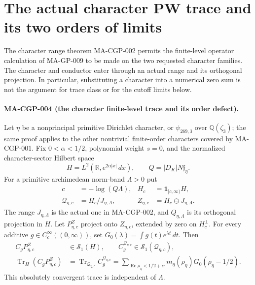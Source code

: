 \section{The actual character PW trace and its two orders of limits}
\label{sec:character-pw-trace}

The character range theorem MA-CGP-002 permits the finite-level
operator calculation of MA-GP-009 to be made on the two requested
character families.  The character and conductor enter through
an actual range and its orthogonal projection.  In particular,
substituting a character into a numerical zero sum is not the
argument for trace class or for the cutoff limits below.

\paragraph{MA-CGP-004 (the character finite-level trace and its order defect).}
Let $\eta$ be a nonprincipal primitive Dirichlet character, or
$\psi_{269,3}$ over $\mathbb Q(\zeta_3)$; the same proof applies
to the other nontrivial finite-order characters covered by
MA-CGP-001.  Fix $0<\alpha<1/2$, polynomial weight $s=0$,
and the normalized character-sector Hilbert space
\[
 H=L^2(\mathbb R,e^{2\alpha|x|}\,dx),\qquad
 Q=|D_K|N\mathfrak f_\eta.
 \tag{MA-CGP.20}
\]
For a primitive archimedean norm-band $\Lambda>0$ put
\[
 \begin{aligned}
 c&=-\log(Q\Lambda),& H_c&=\mathbf1_{[c,\infty)}H,\\
 \mathcal Q_{\eta,c}&=H_c/J_{\eta,\Lambda},&
 Z_{\eta,c}&=H_c\ominus J_{\eta,\Lambda}.
 \end{aligned}
 \tag{MA-CGP.21}
\]
The range $J_{\eta,\Lambda}$ is the actual one in MA-CGP-002,
and $Q_{\eta,\Lambda}$ is its orthogonal projection in $H$.
Let $P_{\eta,c}^Z$ project onto $Z_{\eta,c}$, extended by
zero on $H_c^\perp$.  For every additive
$g\in C_c^\infty((0,\infty))$, set
$G_0(\lambda)=\int g(t)e^{\lambda t}\,dt$.
Then
\[
 \begin{aligned}
 C_gP_{\eta,c}^Z&\in\mathcal S_1(H),\qquad
 C_g^{\mathcal Q_{\eta,c}}\in\mathcal S_1(\mathcal Q_{\eta,c}),\\
 \operatorname{Tr}_H(C_gP_{\eta,c}^Z)
  &=\operatorname{Tr}_{\mathcal Q_{\eta,c}}C_g^{\mathcal Q_{\eta,c}}
    =\sum_{\operatorname{Re}\rho_\eta<1/2+\alpha}
             m_\eta(\rho_\eta)G_0(\rho_\eta-1/2).
 \end{aligned}
 \tag{MA-CGP.22}
\]
This absolutely convergent trace is independent of $\Lambda$.


